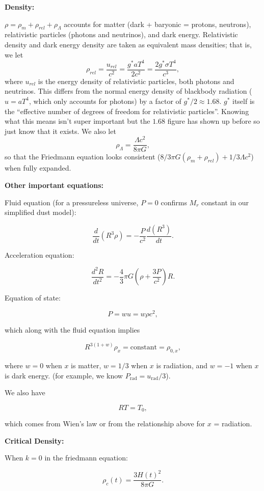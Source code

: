 \documentclass[12pt]{article}
\newcommand{\V}{

\vspace{\baselineskip}

}
\begin{document}
\textbf{Density:}

$\rho = \rho_{m} + \rho_{rel} + \rho_{\Lambda}$ accounts for matter (dark + baryonic = protons, neutrons), relativistic particles (photons and neutrinos), and dark energy. Relativistic density and dark energy density are taken as equivalent mass densities; that is, we let 
\[\rho_{rel} = \frac{u_{rel}}{c^{2}} = \frac{g^{*}aT^{4}}{2c^{2}} = \frac{2g^{*}\sigma T^{4}}{c^{3}},\]
where $u_{rel}$ is the energy density of relativistic particles, both photons and neutrinos. This differs from the normal energy density of blackbody radiation ($u=aT^{4}$, which only accounts for photons) by a factor of $g^{*}/2\approx 1.68$. $g^{*}$ itself is the ``effective number of degrees of freedom for relativistic particles''. Knowing what this means isn't super important but the $1.68$ figure has shown up before so just know that it exists. We also let 
\[\rho_{\Lambda} = \frac{\Lambda c^{2}}{8\pi G},\]
so that the Friedmann equation looks consistent ($8/3\pi G(\rho_{m}+\rho_{rel}) + 1/3\Lambda c^{2}$) when fully expanded.\V

\textbf{Other important equations:}

Fluid equation (for a pressureless universe, $P=0$ confirms $M_{r}$ constant in our simplified dust model):

\[\frac{d}{dt}(R^{3}\rho) = -\frac{P}{c^{2}}\frac{d(R^{3})}{dt}.\]

Acceleration equation:

\[\frac{d^{2}R}{dt^{2}} = -\frac{4}{3}\pi G\left(\rho + \frac{3P}{c^{2}}\right)R.\]

Equation of state:

\[P = wu = w\rho c^{2},\]

which along with the fluid equation implies

\[R^{3(1+w)}\rho_{x} = \text{constant} = \rho_{0,x},\]

where $w=0$ when $x$ is matter, $w=1/3$ when $x$ is radiation, and $w=-1$ when $x$ is dark energy. (for example, we know $P_{\text{rad}} = u_{\text{rad}}/3$).

We also have 

\[RT = T_{0},\]

which comes from Wien's law or from the relationship above for $x$ = radiation.\V

\textbf{Critical Density:}

When $k=0$ in the friedmann equation:

\begin{equation*}
\rho_{c}(t) = \frac{3H(t)^{2}}{8\pi G}.
\end{equation*}\V
\end{document}
